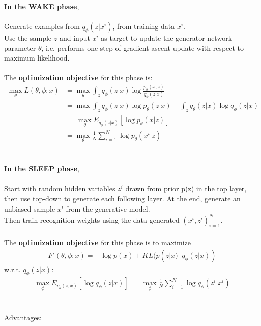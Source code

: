 \documentclass{article}
\begin{document}
\subsubsection{}
\textbf{In the WAKE phase}, 
\\
\\
Generate examples from $q_{\phi}(z|x^i)$, from training data $x^i$. \\
Use the sample $z$ and input $x^i$ as target to update the generator network parameter $\theta$, i.e. performs one step of gradient ascent update with respect to maximum likelihood.
\\
\\
The \textbf{optimization objective} for this phase is:  \\
\begin{align*}
	\max_{\theta} L(\theta, \phi; x) &= \max_{\theta} \int_z q_{\phi}(z|x)\log \frac{p_{\theta}(x, z)}{q_{\phi}(z|x)} \\
	& = \max \int_z q_{\phi}(z|x)\log p_{\theta}(z|x) - \int_z q_{\theta}(z|x)\log q_{\phi}(z|x) \\
	&= \ \max_{\theta}E_{q_{\phi}(z|x)}[\log p_{\theta}(x|z)] \\ &=  \max_{\theta}\frac{1}{N}\sum_{i=1}^N \log p_{\theta}(x^i|z)
\end{align*}
\\
\\
\textbf{In the SLEEP phase}, 
\\
\\
Start with random hidden variables $z^i$ drawn from prior p(z) in the top layer, then use top-down to generate each following layer. At the end, generate an unbiased sample $x^i$ from the generative model. \\
Then train recognition weights using the data generated $(x^i, z^i)_{i=1}^N$.
\\
\\
The \textbf{optimization objective} for this phase is to maximize 
\begin{align*}
	F'(\theta, \phi; x) = -\log p(x) + KL(p(z|x) || q_{\phi}(z|x))
\end{align*} 
w.r.t. $q_{\phi}(z|x)$: \\
\begin{align*}
	\max_{\phi}E_{p_{\theta}(z,x)}[\log q_{\phi}(z|x)]\ = \ \max_{\phi}\frac{1}{N}\sum_{i=1}^N \log q_{\phi}(z^i|x^i)
\end{align*}
\\
\\
Advantages: \\
\end{document}
